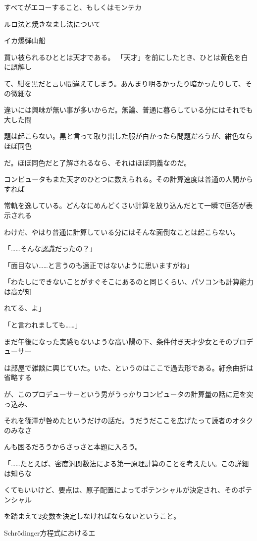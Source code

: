 すべてがエコーすること、もしくはモンテカ\par
ルロ法と焼きなまし法について\par
イカ爆弾∕⼭船\par
買い被られるひととは天才である。 「天才」を前にしたとき、ひとは黄⾊を⽩に誤解し\par
て、紺を黒だと⾔い間違えてしまう。あんまり明るかったり暗かったりして、その微細な\par
違いには興味が無い事が多いからだ。無論、普通に暮らしている分にはそれでも⼤した問\par
題は起こらない。黒と⾔って取り出した服が⽩かったら問題だろうが、紺⾊ならほぼ同⾊\par
だ。ほぼ同⾊だと了解されるなら、それはほぼ同義なのだ。\par
コンピュータもまた天才のひとつに数えられる。その計算速度は普通の⼈間からすれば\par
常軌を逸している。どんなにめんどくさい計算を放り込んだとて⼀瞬で回答が表⽰される\par
わけだ、やはり普通に計算している分にはそんな⾯倒なことは起こらない。\par
「……そんな認識だったの？」\par
「⾯⽬ない……と⾔うのも適正ではないように思いますがね」\par
「わたしにできないことがすぐそこにあるのと同じくらい、パソコンも計算能⼒は⾼が知\par
れてる、よ」\par
「と⾔われましても……」\par
まだ午後になった実感もないような⾼い陽の下、条件付き天才少⼥とそのプロデューサー\par
は部屋で雑談に興じていた。いた、というのはここで過去形である。紆余曲折は省略する\par
が、このプロデューサーという男がうっかりコンピュータの計算量の話に⾜を突っ込み、\par
それを篠澤が咎めたというだけの話だ。うだうだここを広げたって読者のオタクのみなさ\par
んも困るだろうからさっさと本題に⼊ろう。\par
「……たとえば、密度汎関数法による第⼀原理計算のことを考えたい。この詳細は知らな\par
くてもいいけど、要点は、原⼦配置によってポテンシャルが決定され、そのポテンシャル\par
を踏まえて2変数を決定しなければならないということ。\par
Schrödinger⽅程式におけるエ\par
